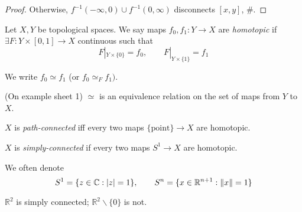 \documentclass[a4paper,11pt]{article}
\begin{document}
	\begin{proof}
		Otherwise, $f^{-1}(-\infty,0)\cup f^{-1}(0,\infty)$ disconnects $[x,y]$, \#. 
	\end{proof}

	\begin{defi}
		Let $X,Y$ be topological spaces. We say maps $f_0, f_1 : Y \to X$ are \emph{homotopic} if $\exists F : Y \times [0,1] \to X$ continuous such that
		\[
			F|_{Y \times \{0\}} = f_0, \qquad F|_{Y \times \{1\}} = f_1
		\]
		
		We write $f_0 \simeq f_1$ (or $f_0 \simeq_F f_1)$.
	\end{defi}

	\begin{exer}
		(On example sheet 1) $\simeq$ is an equivalence relation on the set of maps from $Y$ to $X$.
	\end{exer}

	\begin{nt}
		$X$ is \emph{path-connected} iff every two maps $\{\text{point}\} \to X$ are homotopic.
	\end{nt}

	\begin{defi}
		$X$ is \emph{simply-connected} if every two maps $S^1 \to X$ are homotopic.
	\end{defi}

	\begin{nt}
		We often denote
		\[
			S^1 = \{z \in \mathbb{C} : \abs{z} = 1\}, \qquad S^n = \{x\in \mathbb{R}^{n+1} : \norm{x} = 1\}
		\]
	\end{nt}

	\begin{ex}
		$\mathbb{R}^2$ is simply connected; $\mathbb{R}^2 \backslash \{0\}$ is not.
	\end{ex}	
\end{document}
